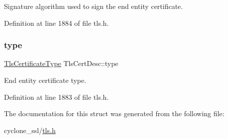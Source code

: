 Signature algorithm used to sign the end entity certificate. 



Definition at line 1884 of file tls.\+h.

\mbox{\label{structTlsCertDesc_af06c965a4e4273bfb971f6ab67c715a2}} 
\subsubsection{\texorpdfstring{type}{type}}
{\footnotesize\ttfamily \hyperlink{tls_8h_a9bd45859e2bffbd3edb8beff07240ffd}{Tls\+Certificate\+Type} Tls\+Cert\+Desc\+::type}



End entity certificate type. 



Definition at line 1883 of file tls.\+h.



The documentation for this struct was generated from the following file\+:\begin{DoxyCompactItemize}
\item 
cyclone\+\_\+ssl/\hyperlink{tls_8h}{tls.\+h}\end{DoxyCompactItemize}
